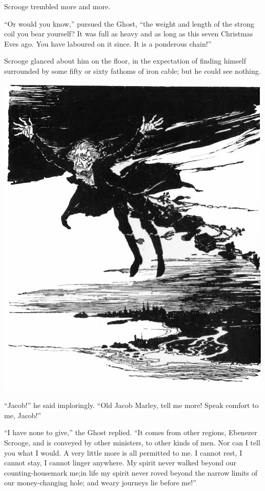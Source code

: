 \documentclass[paper=5.5in:8.5in,BCOR=10mm,twoside,DIV=15,12pt,usegeometry,openany]{scrbook} %
\begin{document}
Scrooge trembled more and more.

\enquote{Or would you know,} pursued the Ghost, \enquote{the weight and length of the strong coil you bear yourself? It was full as heavy and as long as this seven Christmas Eves ago. You have laboured on it since. It is a ponderous chain!}

Scrooge glanced about him on the floor, in the expectation of finding himself surrounded by some fifty or sixty fathoms of iron cable; but he could see nothing.

\cleardoubleevenemptypage
\begin{center} 
\vfill
    \includegraphics[width=\columnwidth]{gs045}
    \vfill
\end{center}
\newpage

\enquote{Jacob!} he said imploringly. \enquote{Old Jacob Marley, tell me more! Speak comfort to me, Jacob!}

\enquote{I have none to give,} the Ghost replied. \enquote{It comes from other regions, Ebenezer Scrooge, and is conveyed by other ministers, to other kinds of men. Nor can I tell you what I would. A very little more is all permitted to me. I cannot rest, I cannot stay, I cannot linger anywhere. My spirit never walked beyond our counting-house\textemdash mark me;\textemdash in life my spirit never roved beyond the narrow limits of our money-changing hole; and weary journeys lie before me!}
\end{document}
